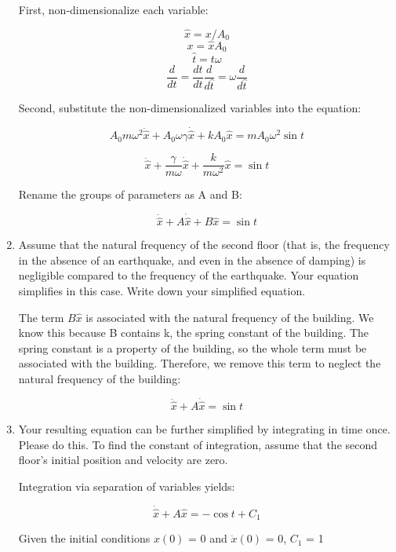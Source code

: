 \documentclass[11pt,answers]{exam}
\begin{document}
\begin{questions}
\begin{enumerate}
\begin{solution}

First, non-dimensionalize each variable:

$$\hat{x} = x/A_0$$
$$x = \hat{x}A_0$$
$$ \hat{t} = t\omega $$
$$\frac{d}{dt} = \frac{d\hat{t}}{dt}\frac{d}{d\hat{t}} = \omega\frac{d}{d\hat{t}}$$

Second, substitute the non-dimensionalized variables into the equation:

$$A_0m\omega^2\ddot{\hat{x}} + A_0\omega\gamma\dot{\hat{x}} + kA_0\hat{x} = mA_0\omega^2\sin{t}$$

$$\ddot{\hat{x}} + \frac{\gamma}{m\omega}\dot{\hat{x}} + \frac{k}{m\omega^2}\hat{x} = \sin{t}$$

Rename the groups of parameters as A and B:

$$\ddot{\hat{x}} + A\dot{\hat{x}} + B\hat{x} = \sin{t}$$

\end{solution}
\item Assume that the natural frequency of the second floor (that is, the frequency in the absence of an earthquake, and even in the absence of damping) is negligible compared to the frequency of the earthquake. Your equation simplifies in this case. Write down your simplified equation.

\begin{solution}

The term $B\hat{x}$ is associated with the natural frequency of the building. We know this because B contains k, the spring constant of the building. The spring constant is a property of the building, so the whole term must be associated with the building. Therefore, we remove this term to neglect the natural frequency of the building:

$$\ddot{\hat{x}} + A\dot{\hat{x}} = \sin{t}$$

\end{solution}

\item Your resulting equation can be further simplified by integrating in time once. Please do this. To find the constant of integration, assume that the second floor’s initial position and velocity are zero.

\begin{solution}

Integration via separation of variables yields:

$$\dot{\hat{x}} + A\hat{x} = -\cos{t} + C_1$$

Given the initial conditions $x(0)$ = 0 and $\dot{x}(0)$ = 0, $C_1$ = 1


\end{solution}
\end{enumerate}
\end{questions}
\end{document}
